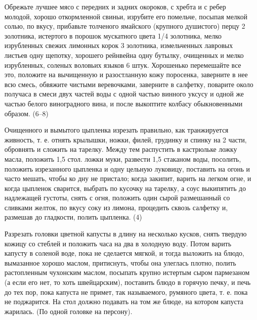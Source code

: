 
Обрежьте лучшее мясо с передних и задних окороков, с хребта и с ребер молодой, хорошо откормленной свиньи, изрубите его помельче, посыпая мелкой солью, по вкусу, прибавьте толченого ямайского (крупного душистого) перцу 2 золотника, истертого в порошок мускатного цвета 1/4 золотника, мелко изрубленных свежих лимонных корок 3 золотника, измельченных лавровых листьев одну щепотку, хорошего рейнвейна одну бутылку, очищенных и мелко изрубленных, соленых воловьих языков 6 штук. Хорошенько перемешайте все это, положите на вычищенную и разостланную кожу поросенка, заверните в нее всю смесь, обвяжите чистыми веревочками, заверните в салфетку, поварите около получаса в смеси двух частей воды с одной частью винного уксусу и одной же частью белого виноградного вина, и после выкоптите колбасу обыкновенными образом. (6--8) 


Очищенного и вымытого цыпленка изрезать правильно, как транжируется живность, т. е. отнять крылышки, ножки, филей, грудинку и спинку на 2 части, обровнять и сложить на тарелку. Между тем распустить в кастрюльке ложку масла, положить 1,5 стол. ложки муки, развести 1,5 стаканом воды, посолить, положить изрезанного цыпленка и одну цельную луковицу, поставить на огонь и часто мешать, чтобы ко дну не пристало; когда закипит, варить на легком огне, и когда цыпленок сварится, выбрать по кусочку на тарелку, а соус выкипятить до надлежащей густоты, снять с огня, положить один сырой размешанный со сливками желток, по вкусу соку из лимона, процедить сквозь салфетку и, размешав до гладкости, полить цыпленка. (4) 


Разрезать головки цветной капусты в длину на несколько кусков, снять твердую кожицу со стеблей и положить часа на два в холодную воду. Потом варить капусту в соленой воде, пока не сделается мягкой, и тогда выложить на блюдо, вымазанное хорошо маслом, притиснуть, чтобы она улеглась плотно, полить растопленным чухонским маслом, посыпать крупно истертым сыром пармезаном (а если его нет, то хоть швейцарским), поставить блюдо в горячую печку, и печь до тех пор, пока капуста не примет, так называемого, румяного цвета, т. е. пока не поджарится. На стол должно подавать на том же блюде, на котором капуста жарилась. (По одной головке на персону). 

